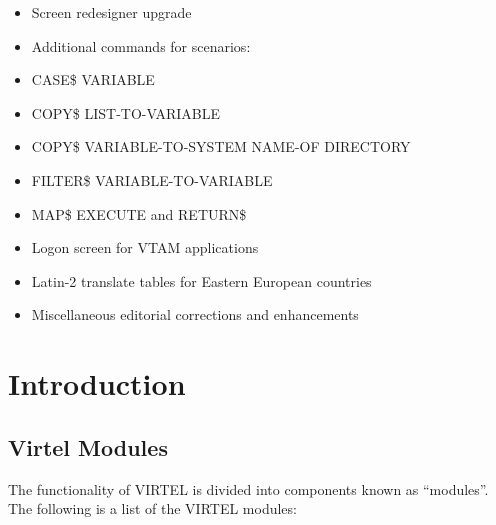 \documentclass[letterpaper,10pt,english]{sphinxmanual}
\begin{document}
\begin{itemize}
\item {} 
Screen redesigner upgrade

\item {} 
Additional commands for scenarios:

\item {} 
CASE\$ VARIABLE

\item {} 
COPY\$ LIST-TO-VARIABLE

\item {} 
COPY\$ VARIABLE-TO-SYSTEM NAME-OF DIRECTORY

\item {} 
FILTER\$ VARIABLE-TO-VARIABLE

\item {} 
MAP\$ EXECUTE and RETURN\$

\end{itemize}

\begin{itemize}
\item {} 
Logon screen for VTAM applications

\item {} 
Latin-2 translate tables for Eastern European countries

\item {} 
Miscellaneous editorial corrections and enhancements

\end{itemize}


\chapter{Introduction}
\label{\detokenize{Installation_Guide:introduction}}\label{\detokenize{Installation_Guide:v457ig-introduction}}

\section{Virtel Modules}
\label{\detokenize{Installation_Guide:virtel-modules}}\label{\detokenize{Installation_Guide:index-0}}
The functionality of VIRTEL is divided into components known as “modules”. The following is a list of the VIRTEL modules:

\end{document}
